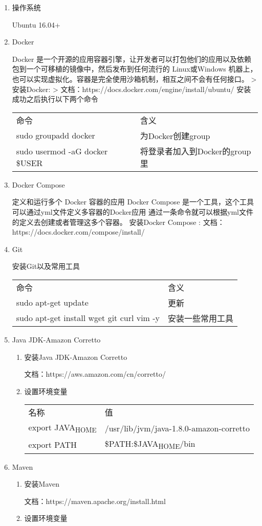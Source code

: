 \documentclass{article}
\begin{document}
\begin{enumerate}
\item
  操作系统

  Ubuntu 16.04+
\item
  Docker

  Docker
  是一个开源的应用容器引擎，让开发者可以打包他们的应用以及依赖包到一个可移植的镜像中，然后发布到任何流行的
  Linux或Windows
  机器上，也可以实现虚拟化。容器是完全使用沙箱机制，相互之间不会有任何接口。
  \textgreater{} 安装Docker: \textgreater{}
  文档：https://docs.docker.com/engine/install/ubuntu/
  安装成功之后执行以下两个命令

  \begin{longtable}[]{@{}ll@{}}
  \toprule
  \endhead
  命令 & 含义\tabularnewline
  sudo groupadd docker & 为Docker创建group\tabularnewline
  sudo usermod -aG docker \$USER &
  将登录者加入到Docker的group里\tabularnewline
  \bottomrule
  \end{longtable}
\item
  Docker Compose

  定义和运行多个 Docker 容器的应用 Docker Compose
  是一个工具，这个工具可以通过yml文件定义多容器的Docker应用
  通过一条命令就可以根据yml文件的定义去创建或者管理这多个容器。
  安装Docker Compose : 文档：https://docs.docker.com/compose/install/
\item
  Git

  安装Git以及常用工具

  \begin{longtable}[]{@{}ll@{}}
  \toprule
  \endhead
  命令 & 含义\tabularnewline
  sudo apt-get update & 更新\tabularnewline
  sudo apt-get install wget git curl vim -y &
  安装一些常用工具\tabularnewline
  \bottomrule
  \end{longtable}
\item
  Java JDK-Amazon Corretto

  \begin{enumerate}
  \item
    安装Java JDK-Amazon Corretto

    文档：https://aws.amazon.com/cn/corretto/
  \item
    设置环境变量

    \begin{longtable}[]{@{}ll@{}}
    \toprule
    \endhead
    名称 & 值\tabularnewline
    export JAVA\textsubscript{HOME} &
    /usr/lib/jvm/java-1.8.0-amazon-corretto\tabularnewline
    export PATH & \$PATH:\$JAVA\textsubscript{HOME}/bin\tabularnewline
    \bottomrule
    \end{longtable}
  \end{enumerate}
\item
  Maven

  \begin{enumerate}
  \item
    安装Maven

    文档：https://maven.apache.org/install.html
  \item
    设置环境变量
  \end{enumerate}
\end{enumerate}
\end{document}
